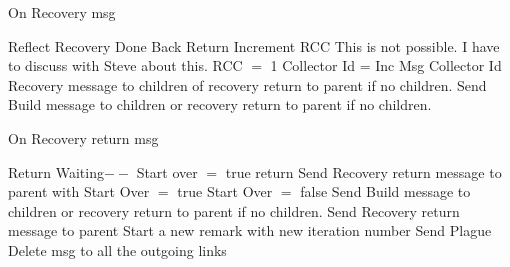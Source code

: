 \documentclass{article}
\begin{document}
\begin{algorithm}
\caption{On Recovery msg}
\label{Recovery message received}
\begin{algorithmic}[1]
\State Reflect Recovery Done Back
\State Return
\State Increment RCC
\Else
\State This is not possible.  I have to discuss with Steve about this.
\State RCC $=$ 1
\State Collector Id = Inc Msg Collector Id
\EndIf
{}
\State Recovery message to children of recovery return to parent if no children.
\EndIf
{} 
\State Send Build message to children or recovery return to parent if no children.
\EndIf
\EndProcedure
\end{algorithmic}
\end{algorithm}	


\begin{algorithm}
\caption{On Recovery return msg}
\label{Recovery return message received}
\begin{algorithmic}[1]
\State Return
\EndIf
\State Waiting$--$
\State Start over $=$ true
\EndIf
{}
\State return
\EndIf
{}
\State Send Recovery return message to parent with Start Over $=$ true
\State Start Over $=$ false
\State Send Build message to children or recovery return to parent if no children.
\State Send Recovery return message to parent
\EndIf
{}
\State Start a new remark with new iteration number
\State Send Plague Delete msg to all the outgoing links
\EndIf
\EndProcedure
\end{algorithmic}
\end{algorithm}	
\end{document}
